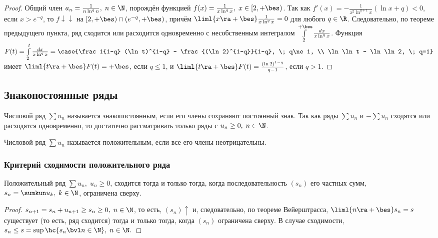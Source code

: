 \documentclass[a4paper]{article}
\begin{document}
\begin{proof}
Общий член $a_n = \frac1{n\ln^qn}, \; n\in\N$, порождён функцией
$f(x) = \frac1{x\ln^qx}, \; x\in[2,+\bes)$. Так как $f'(x) =
-\frac1{x^2\ln^{q+1}x} (\ln x + q)<0$, если $x > e^{-q}$, то
$f\downarrow\downarrow$ на $[2,+\bes) \cap (e^{-q},+\bes)$, причём
$\liml{x\ra+\bes} \frac1{x\ln^qx}=0$ для любого $q\in\R$.
Следовательно, по теореме предыдущего пункта, ряд сходится или
расходится одновременно с несобственным интегралом
$\int\limits_2^{+\bes} \frac{dx}{x\ln^qx}$. Функция $F(t) =
\int\limits_2^t \frac{dx}{x\ln^qx} = \case{\frac1{1-q} (\ln t)^{1-q}
- \frac{(\ln 2)^{1-q}}{1-q}, \; q\ne1, \\ \ln \ln t - \ln \ln 2, \;
q=1}$ имеет $\liml{t\ra+\bes} F(t) = +\bes$, если $q\le1$, и
$\liml{t\ra+\bes} F(t) = \frac{(\ln 2)^{1-q}}{q-1}$, если $q>1$.
\end{proof}

\subsection{Знакопостоянные ряды}
Числовой ряд $\sum u_n$ называется знакопостоянным, если его члены
сохраняют постоянный знак. Так как ряды $\sum u_n$ и $-\sum u_n$
сходятся или расходятся одновременно, то достаточно рассматривать
только ряды с $u_n\ge0, \; n\in\N$.

\begin{df}
Числовой ряд $\sum u_n$ называется положительным, если все его члены
неотрицательны.
\end{df}

\subsubsection{Критерий сходимости положительного ряда}

\begin{theorem}\label{thm1.12}
Положительный ряд $\sum u_n, \; u_n\ge0$, сходится тогда и только
тогда, когда последовательность $(s_n)$ его частных сумм, $s_n =
\sumkun u_k, \; k\in\N$, ограничена сверху.
\end{theorem}

\begin{proof}
$s_{n+1} = s_n + u_{n+1} \ge s_n \ge 0, \; n\in\N$, то есть,
$(s_n)\uparrow$ и, следовательно, по теореме Вейерштрасса,
$\liml{n\ra+\bes} s_n = s$ существует (то есть, ряд сходится) тогда
и только тогда, когда $(s_n)$ ограничена сверху. В случае
сходимости, $s_n \le s = \sup \hc{s_n \bvl n\in\N}, \; n\in\N.$
\end{proof}
\end{document}
